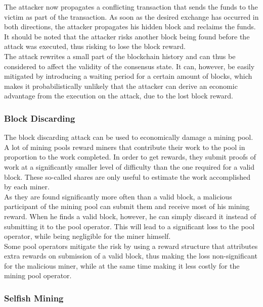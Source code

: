 \documentclass[11pt,a4paper,draft]{article}
\begin{document}
The attacker now propagates a conflicting transaction that sends the funds to the victim as part of the transaction. As soon as the desired exchange has occurred in both directions, the attacker propagates his hidden block and reclaims the funds. It should be noted that the attacker risks another block being found before the attack was executed, thus risking to lose the block reward.\\

The attack rewrites a small part of the blockchain history and can thus be considered to affect the validity of the consensus state. It can, however, be easily mitigated by introducing a waiting period for a certain amount of blocks, which makes it probabilistically unlikely that the attacker can derive an economic advantage from the execution on the attack, due to the lost block reward.\\

\subsubsection{Block Discarding}

The block discarding attack can be used to economically damage a mining pool. A lot of mining pools reward miners that contribute their work to the pool in proportion to the work completed. In order to get rewards, they submit proofs of work at a significantly smaller level of difficulty than the one required for a valid block. These so-called shares are only useful to estimate the work accomplished by each miner.\\

As they are found significantly more often than a valid block, a malicious participant of the mining pool can submit them and receive most of his mining reward. When he finds a valid block, however, he can simply discard it instead of submitting it to the pool operator. This will lead to a significant loss to the pool operator, while being negligible for the miner himself.\\

Some pool operators mitigate the risk by using a reward structure that attributes extra rewards on submission of a valid block, thus making the loss non-significant for the malicious miner, while at the same time making it less costly for the mining pool operator.\\

\subsubsection{Selfish Mining}
\end{document}
